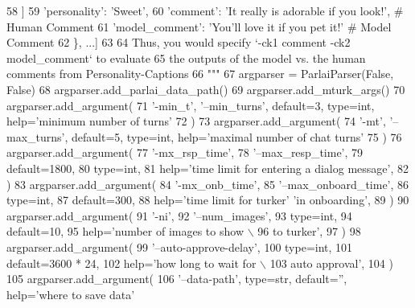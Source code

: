 \begin{DoxyCode}
58 \textcolor{stringliteral}{            ]}
59 \textcolor{stringliteral}{            'personality': 'Sweet',}
60 \textcolor{stringliteral}{            'comment': 'It really is adorable if you look!', # Human Comment}
61 \textcolor{stringliteral}{            'model\_comment': 'You'll love it if you pet it!' # Model Comment}
62 \textcolor{stringliteral}{        \}, ...]}
63 \textcolor{stringliteral}{}
64 \textcolor{stringliteral}{        Thus, you would specify `-ck1 comment -ck2 model\_comment` to evaluate}
65 \textcolor{stringliteral}{        the outputs of the model vs. the human comments from Personality-Captions}
66 \textcolor{stringliteral}{    """}
67     argparser = ParlaiParser(\textcolor{keyword}{False}, \textcolor{keyword}{False})
68     argparser.add\_parlai\_data\_path()
69     argparser.add\_mturk\_args()
70     argparser.add\_argument(
71         \textcolor{stringliteral}{'-min\_t'}, \textcolor{stringliteral}{'--min\_turns'}, default=3, type=int, help=\textcolor{stringliteral}{'minimum number of turns'}
72     )
73     argparser.add\_argument(
74         \textcolor{stringliteral}{'-mt'}, \textcolor{stringliteral}{'--max\_turns'}, default=5, type=int, help=\textcolor{stringliteral}{'maximal number of chat turns'}
75     )
76     argparser.add\_argument(
77         \textcolor{stringliteral}{'-mx\_rsp\_time'},
78         \textcolor{stringliteral}{'--max\_resp\_time'},
79         default=1800,
80         type=int,
81         help=\textcolor{stringliteral}{'time limit for entering a dialog message'},
82     )
83     argparser.add\_argument(
84         \textcolor{stringliteral}{'-mx\_onb\_time'},
85         \textcolor{stringliteral}{'--max\_onboard\_time'},
86         type=int,
87         default=300,
88         help=\textcolor{stringliteral}{'time limit for turker'} \textcolor{stringliteral}{'in onboarding'},
89     )
90     argparser.add\_argument(
91         \textcolor{stringliteral}{'-ni'},
92         \textcolor{stringliteral}{'--num\_images'},
93         type=int,
94         default=10,
95         help=\textcolor{stringliteral}{'number of images to show \(\backslash\)}
96 \textcolor{stringliteral}{                           to turker'},
97     )
98     argparser.add\_argument(
99         \textcolor{stringliteral}{'--auto-approve-delay'},
100         type=int,
101         default=3600 * 24,
102         help=\textcolor{stringliteral}{'how long to wait for  \(\backslash\)}
103 \textcolor{stringliteral}{                           auto approval'},
104     )
105     argparser.add\_argument(
106         \textcolor{stringliteral}{'--data-path'}, type=str, default=\textcolor{stringliteral}{''}, help=\textcolor{stringliteral}{'where to save data'}

\end{DoxyCode}
